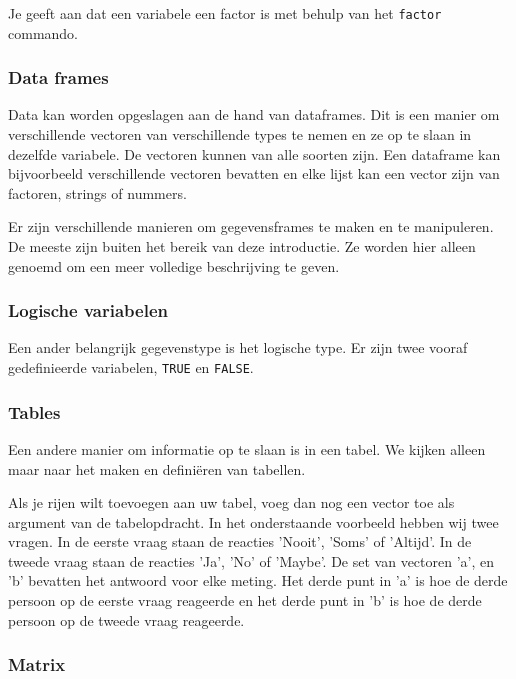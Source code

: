 Je geeft aan dat een variabele een factor is met behulp van het \texttt{factor} commando. 

\subsubsection{Data frames}

Data kan worden opgeslagen aan de hand van dataframes. Dit is een manier om verschillende vectoren van verschillende types te nemen en ze op te slaan in dezelfde variabele. De vectoren kunnen van alle soorten zijn. Een dataframe kan bijvoorbeeld verschillende vectoren bevatten en elke lijst kan een vector zijn van factoren, strings of nummers.

Er zijn verschillende manieren om gegevensframes te maken en te manipuleren. De meeste zijn buiten het bereik van deze introductie. Ze worden hier alleen genoemd om een meer volledige beschrijving te geven. 



\subsubsection{Logische variabelen}

Een ander belangrijk gegevenstype is het logische type. Er zijn twee vooraf gedefinieerde variabelen, \texttt{TRUE} en \texttt{FALSE}.

\subsubsection{Tables}

Een andere  manier om informatie op te slaan is in een tabel.  We kijken alleen maar naar het maken en defini\"eren van tabellen. 


Als je rijen wilt toevoegen aan uw tabel, voeg dan nog een vector toe als argument van de tabelopdracht. In het onderstaande voorbeeld hebben wij twee vragen. In de eerste vraag staan de reacties  'Nooit', 'Soms' of 'Altijd'. In de tweede vraag staan de reacties 'Ja', 'No' of 'Maybe'. De set van vectoren 'a', en 'b' bevatten het antwoord voor elke meting. Het derde punt in 'a' is hoe de derde persoon op de eerste vraag reageerde en het derde punt in 'b' is hoe de derde persoon op de tweede vraag reageerde.



\subsubsection{Matrix}

